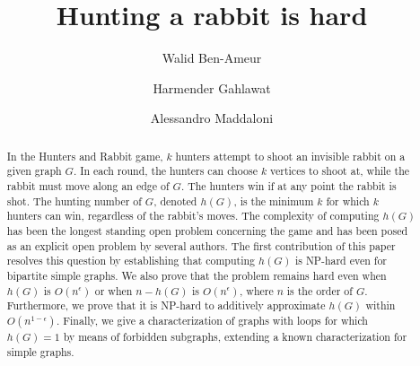 \documentclass[runningheads]{llncs}
\begin{document}
\title{Hunting a rabbit is hard}
%
\author{Walid Ben-Ameur \and
Harmender Gahlawat \and
Alessandro Maddaloni}
%
%
%
\maketitle        








\begin{abstract}
In the Hunters and Rabbit game, $k$ hunters attempt to  shoot an invisible rabbit on a given graph $G$. In each round, the hunters can choose $k$ vertices to {shoot at}, while the rabbit must move along an edge of $G$. The hunters win if  at any point the rabbit is shot. 
The hunting number of $G$, denoted $h(G)$, is the minimum $k$ for which $k$ hunters can win, regardless of the rabbit's moves. 
The complexity of computing $h(G)$ has been the longest standing open problem concerning the game and has been posed as an explicit open problem by several authors. 
The first contribution of this paper resolves this question by establishing that
computing $h(G)$ is NP-hard even for bipartite simple graphs. We also prove that the problem remains hard even when $h(G)$ is $O(n^{\epsilon})$ or when $n-h(G)$ is $O(n^{\epsilon})$, where $n$ is the order of $G$. Furthermore, we prove that it is NP-hard to additively approximate $h(G)$ within $O(n^{1-\epsilon})$. Finally, we give a characterization of graphs {with loops} for which $h(G)=1$ by means of forbidden subgraphs, extending a known characterization for simple graphs.
\end{abstract}
\end{document}
